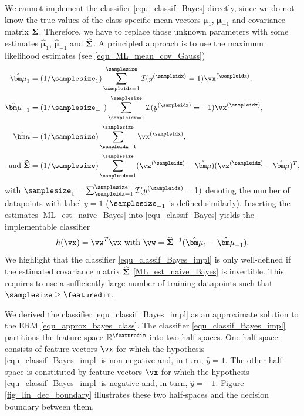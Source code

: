 \documentclass[12pt]{report}
\begin{document}
We cannot implement the classifier \eqref{equ_classif_Bayes} directly, since we do not know the 
true values of the class-specific mean vectors ${\bm \mu}_{1}$, ${\bm \mu}_{-1}$ and covariance 
matrix ${\bf \Sigma}$. Therefore, we have to replace those unknown parameters with some 
estimates $\hat{\bm \mu}_{1}$, $\hat{\bm \mu}_{-1}$ and $\widehat{\bf \Sigma}$. A principled 
approach is to use the maximum likelihood estimates (see \eqref{equ_ML_mean_cov_Gauss}) 
\begin{align}
\hat{\bm \mu}_{1}  & = (1/\samplesize_{1}) \sum_{\sampleidx=1}^{\samplesize} \mathcal{I}(y^{(\sampleidx)}=1) \vx^{(\sampleidx)}, \nonumber \\
\hat{\bm \mu}_{-1}  & = (1/\samplesize_{-1}) \sum_{\sampleidx=1}^{\samplesize} \mathcal{I}(y^{(\sampleidx)}=-1) \vx^{(\sampleidx)}, \nonumber \\
\hat{\bm \mu} & =  (1/\samplesize) \sum_{\sampleidx=1}^{\samplesize} \vx^{(\sampleidx)}, \nonumber \\
 \mbox{and } \widehat{\bf \Sigma} & = (1/\samplesize) \sum_{\sampleidx=1}^{\samplesize} (\vz^{(\sampleidx)} - \hat{\bm \mu})(\vz^{(\sampleidx)} - \hat{\bm \mu})^{T}, \label{ML_est_naive_Bayes}
\end{align}
with $\samplesize_{1} = \sum_{\sampleidx=1}^{\samplesize}  \mathcal{I}(y^{(\sampleidx)}=1)$ 
denoting the number of datapoints with label $y=1$ ($\samplesize_{-1}$ is defined similarly). 
Inserting the estimates \eqref{ML_est_naive_Bayes} into \eqref{equ_classif_Bayes} yields the 
implementable classifier 
\begin{equation}
\label{equ_classif_Bayes_impl}
h(\vx) = \vw^{T} \vx \mbox{ with } \vw =  \widehat{\bf \Sigma}^{-1} (\hat{\bm \mu}_{1} - \hat{\bm \mu}_{-1}). 
\end{equation} 
We highlight that the classifier \eqref{equ_classif_Bayes_impl} is only well-defined if the estimated 
covariance matrix $\widehat{\bf \Sigma}$ \eqref{ML_est_naive_Bayes} is invertible. This requires 
to use a sufficiently large number of training datapoints such that $\samplesize \geq \featuredim$. 

We derived the classifier \eqref{equ_classif_Bayes_impl} as an approximate solution 
to the ERM \eqref{equ_approx_bayes_class}. The classifier \eqref{equ_classif_Bayes_impl} 
partitions the feature space $\mathbb{R}^{\featuredim}$ into two half-spaces. One 
half-space consists of feature vectors $\vx$ for which the hypothesis \eqref{equ_classif_Bayes_impl} 
is non-negative and, in turn, $\hat{y}=1$. The other half-space is constituted by feature 
vectors $\vx$ for which the hypothesis \eqref{equ_classif_Bayes_impl} is negative and, in turn, 
$\hat{y}=-1$. Figure \ref{fig_lin_dec_boundary} illustrates these two half-spaces and the 
decision boundary between them. 
\end{document}
